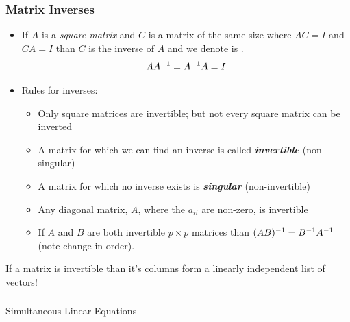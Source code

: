 \documentclass{beamer}
\begin{document}
\begin{frame}
  \frametitle{Matrix Inverses}

\begin{itemize}
\item If $A$ is a \emph{square matrix} and $C$ is a matrix of the same size where $AC = I$ and $CA=I$ than $C$ is the inverse of $A$ and we denote is .
\[
AA^{-1} = A^{-1}A = I
\]

\item Rules for inverses:

\begin{itemize}
 \item Only square matrices are invertible; but not every square matrix can be inverted
 \item A matrix for which we can find an inverse is called \emph{\textbf{invertible}} (non-singular)
 \item A matrix for which no inverse exists is \emph{\textbf{singular}} (non-invertible)
 \item Any diagonal matrix, $A$, where the $a_{ii}$ are non-zero, is invertible
 \item If $A$ and $B$ are both invertible $p \times p$ matrices than $(AB)^{-1} = B^{-1} A^{-1}$ (note change in order).
\end{itemize}
 
\end{itemize}

\begin{Highlight}
  If a matrix is invertible than it's columns form a linearly independent list of vectors!
\end{Highlight}

\end{frame}

\begin{frame}
  \frametitle{}
\begin{center}
\begin{Huge}
{\rmfamily Simultaneous Linear Equations}
\end{Huge}
\end{center}
\end{frame}
\end{document}
